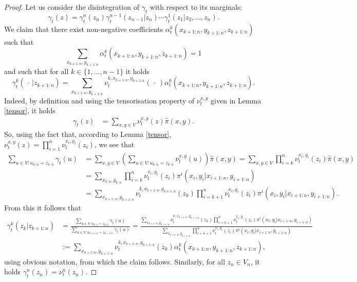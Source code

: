 \documentclass[11pt]{amsart}
\numberwithin{equation}{section}
\begin{document}
\begin{proof}
Let us consider the disintegration of $\gamma_t$ with respect to its marginals:
$$\gamma_t(z)=\gamma_t^n(z_n)\gamma_t^{n-1}(z_{n-1}|z_n)\cdots \gamma_t^{1}(z_1|z_2,\ldots,z_n).$$
We claim that there exist non-negative coefficients $\alpha_{t}^{k}(x_{k+1:n},y_{k+1:n},z_{k+1:n})$ such that $$\sum_{x_{k+1:n},y_{k+1:n}}\alpha_{t}^k(x_{k+1:n},y_{k+1:n},z_{k+1:n})=1$$ and such that for all $k\in \{1,\ldots,n-1\}$ it holds
$$\gamma_{t}^k(\,\cdot\,|z_{k+1:n}) = \sum_{x_{k+1:n}, y_{k+1:n}} \nu_{t}^{k,x_{k+1:n}, y_{k+1:n}}(\,\cdot\,)\alpha_{t}^{k}(x_{k+1:n},y_{k+1:n},z_{k+1:n}).$$
Indeed, by definition and using the tensorisation property of $\nu_t^{x,y}$ given in Lemma \ref{tensor}, it holds
\begin{align*}
\gamma_t(z)&=\sum_{x,y\in V} \nu_t^{x,y}(z)\hat{\pi}(x,y).
\end{align*}
So, using the fact that, according to Lemma \ref{tensor},  $\nu_t^{x,y}(z)=\prod_{i=1}^n\nu_t^{x_i,y_i}(z_i)$, we see that
\begin{align*}
\sum_{u \in V : u_{k:n}=z_{k:n}} \gamma_t(u) &= \sum_{x,y\in V}\left(\sum_{u \in V : u_{k:n}=z_{k:n}}\nu_t^{x,y}(u)\right)\hat{\pi}(x,y)
=\sum_{x,y\in V} \prod_{i=k}^n \nu_t^{x_i,y_i}(z_i)\hat{\pi}(x,y)\\
&=\sum_{x_{k:n},y_{k:n}} \prod_{i=k}^n \nu_t^{x_i,y_i}(z_i)\pi^i(x_i,y_i |x_{i+1:n}, y_{i+1:n})\\ 
&=\sum_{x_{k+1:n},y_{k+1:n}} \nu_t^{k, x_{k+1:n}, y_{k+1:n}}(z_k)\prod_{i=k+1}^n \nu_t^{x_i,y_i}(z_i)\pi^i(x_i,y_i |x_{i+1:n}, y_{i+1:n}) .
\end{align*}
From this it follows that
\begin{align*}
\gamma_t^k(z_k | z_{k+1:n})&= \frac{\displaystyle \sum_{u \in V : u_{k:n}=z_{k:n}} \gamma_t(u)}{\displaystyle\sum_{u \in V : u_{k+1:n}=z_{k+1:n}}\gamma_t(u)}
= \frac{\displaystyle\sum_{x_{k+1:n},y_{k+1:n}} \nu_t^{k, x_{k+1:n}, y_{k+1:n}}(z_k)\prod_{i=k+1}^n \nu_t^{x_i,y_i}(z_i)\pi^i(x_i,y_i |x_{i+1:n}, y_{i+1:n})}{\displaystyle\sum_{x_{k+1:n},y_{k+1:n}} \prod_{i=k+1}^n \nu_t^{x_i,y_i}(z_i)\pi^i(x_i,y_i |x_{i+1:n}, y_{i+1:n})}\\
&:= \sum_{x_{k+1:n},y_{k+1:n}} \nu_t^{k, x_{k+1:n}, y_{k+1:n}}(z_k) \alpha_{t}^k(x_{k+1:n}, y_{k+1:n}, z_{k+1:n}),
\end{align*}
using obvious notation, from which the claim follows.
Similarly, for all $z_n\in V_n$, it holds
$\gamma^n_t(z_n)=\nu^n_t(z_n).$


\end{proof}
\end{document}
